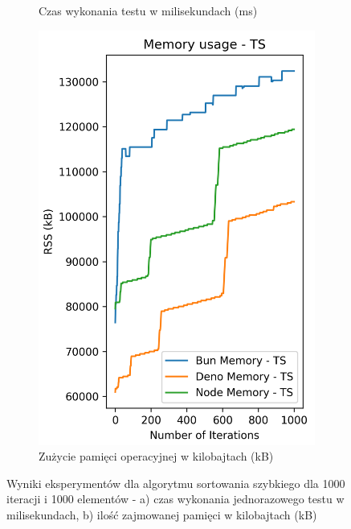 \begin{figure}[H]
\begin{subfigure}[b]{0.42\textwidth}
    \caption{Czas wykonania testu w milisekundach (ms)}
    \label{fig:quick_sorting_e2_ts_time}
  \end{subfigure}
  \begin{subfigure}[b]{0.42\textwidth}
    \centering
    \includegraphics[width=\textwidth]{Figures/sorting/sorting_quick_1000_1000_ts_memory.png}
    \caption{Zużycie pamięci operacyjnej w kilobajtach (kB)}
    \label{fig:quick_sorting_e2_ts_memory}
  \end{subfigure}
  \caption{Wyniki eksperymentów dla algorytmu sortowania szybkiego dla 1000 iteracji i 1000 elementów - a) czas wykonania jednorazowego testu w milisekundach, b) ilość zajmowanej pamięci w kilobajtach (kB)}
  \label{fig:quick_sorting_e2_ts}
\end{figure}

